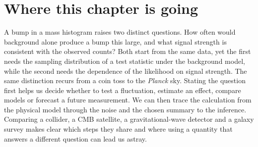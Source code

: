 \providecommand{\ThPfM}{}\renewcommand{\ThPfM}{20}
\providecommand{\ThPfPloc}{}\renewcommand{\ThPfPloc}{0.00135}
\providecommand{\ThPfPglob}{}\renewcommand{\ThPfPglob}{0.0267}
\providecommand{\ThPfZglob}{}\renewcommand{\ThPfZglob}{1.93}
\providecommand{\ThPfPglobSim}{}\renewcommand{\ThPfPglobSim}{0.0266}
\providecommand{\ThPfTrials}{}\renewcommand{\ThPfTrials}{19.7}
\providecommand{\ThPgStat}{}\renewcommand{\ThPgStat}{2}
\providecommand{\ThPgCal}{}\renewcommand{\ThPgCal}{1}
\providecommand{\ThPgTotOne}{}\renewcommand{\ThPgTotOne}{2.24}
\providecommand{\ThPgTotHundred}{}\renewcommand{\ThPgTotHundred}{1.02}
\providecommand{\ThPgSimHundred}{}\renewcommand{\ThPgSimHundred}{1.02}
\providecommand{\ThFiNbins}{}\renewcommand{\ThFiNbins}{40}
\providecommand{\ThFiZmax}{}\renewcommand{\ThFiZmax}{2.95}
\providecommand{\ThFiMmax}{}\renewcommand{\ThFiMmax}{106}
\providecommand{\ThFiPglob}{}\renewcommand{\ThFiPglob}{0.06}
\providecommand{\ThFiPloc}{}\renewcommand{\ThFiPloc}{0.002}
\providecommand{\ThFiPthree}{}\renewcommand{\ThFiPthree}{0.050}
\providecommand{\ThFiPthreeLoc}{}\renewcommand{\ThFiPthreeLoc}{0.00135}
\providecommand{\ThFiNuTwo}{}\renewcommand{\ThFiNuTwo}{5}
\providecommand{\ThFiRho}{}\renewcommand{\ThFiRho}{4}
\providecommand{\ThFiThr}{}\renewcommand{\ThFiThr}{13.82}
\providecommand{\ThFiPdet}{}\renewcommand{\ThFiPdet}{0.66}
\providecommand{\ThFiP}{}\renewcommand{\ThFiP}{10}
\providecommand{\ThFiN}{}\renewcommand{\ThFiN}{40}
\providecommand{\ThFiFa}{}\renewcommand{\ThFiFa}{0.075}
\providecommand{\ThFiMean}{}\renewcommand{\ThFiMean}{10.02}
 
\section*{Where this chapter is going}

A bump in a mass histogram raises two distinct questions. How often would
background alone produce a bump this large, and what signal strength is
consistent with the observed counts? Both start from the same data, yet the
first needs the sampling distribution of a test statistic under the background
model, while the second needs the dependence of the likelihood on signal
strength. The same distinction recurs from a coin toss to the \textit{Planck}
sky. Stating the question first helps us decide whether to test a fluctuation,
estimate an effect, compare models or forecast a future measurement. We can
then trace the calculation from the physical model through the noise and the
chosen summary to the inference. Comparing a collider, a CMB satellite, a
gravitational-wave detector and a galaxy survey makes clear which steps they
share and where using a quantity that answers a different question can lead
us astray.


